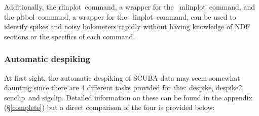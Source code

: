 \documentclass[twoside,11pt]{article}
\newcommand{\Kappa}{\xref{{\sc{Kappa}}}{sun95}{}}
\newcommand{\task}[1]{{\sf #1}}
\newcommand{\sigclip}{\htmlref{\task{sigclip}}{SIGCLIP}}
\newcommand{\despike}{\htmlref{\task{despike}}{DESPIKE}}
\newcommand{\despikeb}{\htmlref{\task{despike2}}{DESPIKE2}}
\newcommand{\scuclip}{\htmlref{\task{scuclip}}{SCUCLIP}}
\newcommand{\pltbol}{\htmlref{\task{pltbol}}{PLTBOL}}
\newcommand{\rlinplot}{\htmlref{\task{rlinplot}}{RLINPLOT}}
\newcommand{\linplot}{\xref{\task{linplot}}{sun95}{LINPLOT}}
\newcommand{\mlinplot}{\xref{\task{mlinplot}}{sun95}{MLINPLOT}}
\newcommand{\htmlref}[2]{#1}
\newcommand{\xref}[3]{#1}
\begin{document}
Additionally, the \rlinplot\ command, a wrapper for the \Kappa\ \mlinplot\
command, and the \pltbol\ command, a wrapper for the \Kappa\ \linplot\
command, can be used to identify spikes and noisy bolometers rapidly without
having knowledge of NDF sections or the specifics of each command.

\subsubsection{Automatic despiking}

At first sight, the automatic despiking of SCUBA data may seem somewhat
daunting since there are 4 different tasks provided for this: \despike,
\despikeb, \scuclip\ and \sigclip. Detailed information on these can be found
in the appendix (\S\ref{complete}) but a direct comparison of the four is
provided below:
\end{document}
